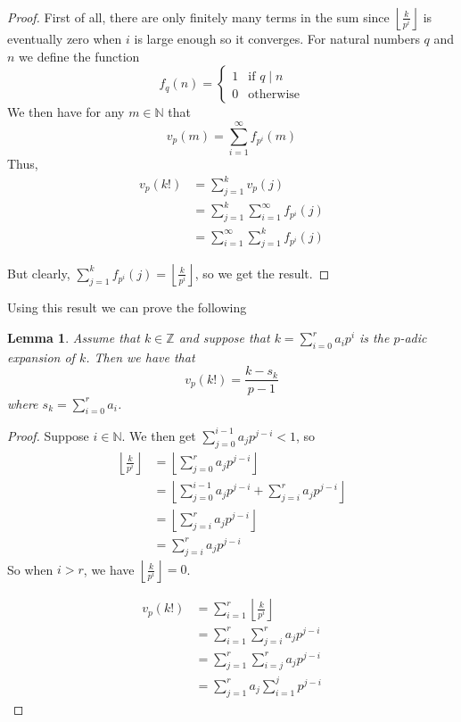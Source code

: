 \documentclass{article}
\newtheorem{lemma}{Lemma}[section]
\newcommand{\mbb}[1]{\mathbb{#1}}
\begin{document}
\begin{proof}
    First of all, there are only finitely many terms in the sum since $\left\lfloor \frac{k}{p^i} \right \rfloor$ is eventually zero when $i$ is large enough so it converges. For natural numbers $q$ and $n$ we define the function 
    $$f_q(n) = \begin{cases}
        1 & \text{if } q \mid n \\
        0 & \text{otherwise}
    \end{cases}$$
    We then have for any $m \in \mbb N$ that
    $$v_p(m) = \sum_{i = 1}^{\infty} f_{p^i}(m)$$
    Thus,
    \begin{align*}
        v_p(k!) &= \sum_{j = 1}^k v_p(j) \\
        &= \sum_{j = 1}^k \sum_{i = 1}^{\infty} f_{p^i}(j) \\
        &= \sum_{i = 1}^{\infty} \sum_{j = 1}^k f_{p^i}(j)
    \end{align*}


    But clearly, $\sum_{j = 1}^k f_{p^i}(j) = \left\lfloor \frac{k}{p^i} \right \rfloor$, so we get the result. 
\end{proof}

Using this result we can prove the following

\begin{lemma}
    Assume that $k \in \mbb Z$ and suppose that $k = \sum_{i = 0}^{r} a_i p^i$ is the $p$-adic expansion of $k$. Then we have that 
    $$v_p(k!) = \frac{k - s_k}{p - 1}$$
    where $s_k = \sum_{i = 0}^{r} a_i$.
\end{lemma}
\begin{proof}
    Suppose $i \in \mbb N$. We then get $\sum_{j = 0}^{i-1}a_j p^{j-i} < 1$, so
    \begin{align*}
        \left\lfloor \frac{k}{p^i} \right \rfloor &= \left \lfloor \sum_{j = 0}^{r} a_j p^{j-i} \right \rfloor \\ 
        &= \left \lfloor \sum_{j = 0}^{i-1}a_j p^{j-i} + \sum_{j=i}^{r} a_j p^{j-i} \right \rfloor \\
        &=  \left \lfloor \sum_{j=i}^{r} a_j p^{j-i} \right \rfloor \\
        &= \sum_{j=i}^{r} a_j p^{j-i}
    \end{align*}
    So when $i > r$, we have $\left\lfloor \frac{k}{p^i} \right \rfloor = 0$.
    
    
    \begin{align*}
        v_p(k!) &= \sum_{i = 1}^{r} \left\lfloor \frac{k}{p^i} \right \rfloor \\
        &= \sum_{i = 1}^{r} \sum_{j=i}^{r} a_j p^{j-i} \\ 
        &= \sum_{j=1}^{r} \sum_{i = j}^{r} a_j p^{j-i} \\
        &= \sum_{j=1}^{r} a_j \sum_{i = 1}^{j} p^{j-i}
    \end{align*}


\end{proof}
\end{document}
